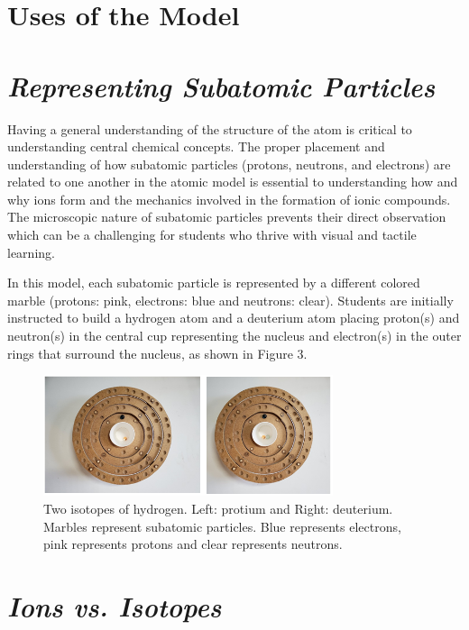\documentclass[11pt]{sig-alternate}
\begin{document}
\begin{large}
\section*{Uses of the Model}
\section*{\textit{Representing Subatomic Particles }}
 
Having a general understanding of the structure of the atom is critical to understanding central chemical concepts.  The proper placement and understanding of how subatomic particles (protons, neutrons, and electrons) are related to one another in the atomic model is essential to understanding how and why ions form and the mechanics involved in the formation of ionic compounds.  The microscopic nature of subatomic particles prevents their direct observation which can be a challenging for students who thrive with visual and tactile learning.  

In this model, each subatomic particle is represented by a different colored marble (protons: pink, electrons: blue and neutrons: clear).  Students are initially instructed to build a hydrogen atom and a deuterium atom placing proton(s) and neutron(s) in the central cup representing the nucleus and electron(s) in the outer rings that surround the nucleus, as shown in Figure 3.

\begin{figure}[htp]
    \leftmargin
    \includegraphics[width=8.5cm]{Figure3.png}
    \caption{Two isotopes of hydrogen.  Left: protium and Right: deuterium.  Marbles represent subatomic particles.  Blue represents electrons, pink represents protons and clear represents neutrons.}
    \label{Two isotopes of hydrogen}
    \label{Figure shows 3D cardboard Bohr models showing the different isotopes of Hydrogen. The isotopes are indicated by the number of different colored marbles placed within the model. The image on the left has no clear marbles and the one on the right has one.}
\end{figure}
\section*{\textit{Ions vs. Isotopes}}


\end{large}
\end{document}

